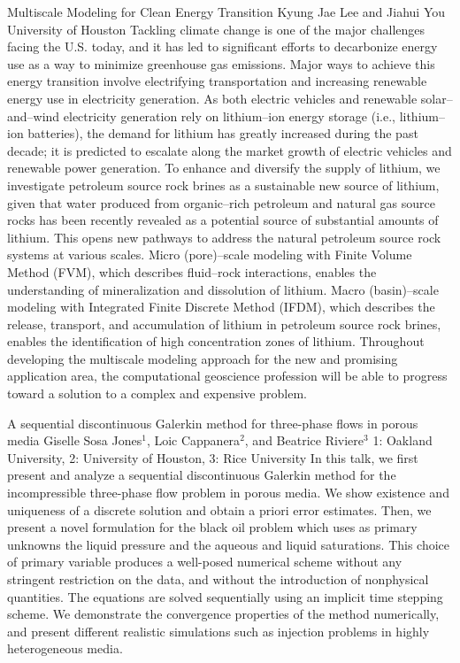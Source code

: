 \begin{addmargin}[2em]{0em}
\vspace{1.5ex}
\abs
{Multiscale Modeling for Clean Energy Transition}
{Kyung Jae Lee and Jiahui You}
{University of Houston}
{Tackling climate change is one of the major challenges facing the U.S. today, and it has led to significant efforts to decarbonize energy use as a way to minimize greenhouse gas emissions. Major ways to achieve this energy transition involve electrifying transportation and increasing renewable energy use in electricity generation. As both electric vehicles and renewable solar–and–wind electricity generation rely on lithium–ion energy storage (i.e., lithium–ion batteries), the demand for lithium has greatly increased during the past decade; it is predicted to escalate along the market growth of electric vehicles and renewable power generation. To enhance and diversify the supply of lithium, we investigate petroleum source rock brines as a sustainable new source of lithium, given that water produced from organic–rich petroleum and natural gas source rocks has been recently revealed as a potential source of substantial amounts of lithium. This opens new pathways to address the natural petroleum source rock systems at various scales. Micro (pore)–scale modeling with Finite Volume Method (FVM), which describes fluid–rock interactions, enables the understanding of mineralization and dissolution of lithium. Macro (basin)–scale modeling with Integrated Finite Discrete Method (IFDM), which describes the release, transport, and accumulation of lithium in petroleum source rock brines, enables the identification of high concentration zones of lithium. Throughout developing the multiscale modeling approach for the new and promising application area, the computational geoscience profession will be able to progress toward a solution to a complex and expensive problem.}


\vspace{1.5ex}
\abs
{A sequential discontinuous Galerkin method for three-phase flows in porous media}
{Giselle Sosa Jones$^{1}$, Loic Cappanera$^{2}$, and Beatrice Riviere$^{3}$}
{1: Oakland University, 2: University of Houston, 3: Rice University}
{In this talk, we first present and analyze a sequential discontinuous Galerkin method for the incompressible three-phase flow problem in porous media. We show existence and uniqueness of a discrete solution and obtain a priori error estimates. Then, we present a novel formulation for the black oil problem which uses as primary unknowns the liquid pressure and the aqueous and liquid saturations. This choice of primary variable produces a well-posed numerical scheme without any stringent restriction on the data, and without the introduction of nonphysical quantities. The equations are solved sequentially using an implicit time stepping scheme. We demonstrate the convergence properties of the method numerically, and present different realistic simulations such as injection problems in highly heterogeneous media.}



\end{addmargin}
